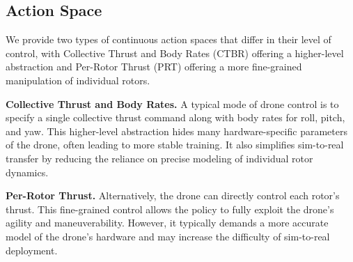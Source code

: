 

\subsection{Action Space}

We provide two types of continuous action spaces that differ in their level of control, with Collective Thrust and Body Rates (CTBR) offering a higher-level abstraction and Per-Rotor Thrust (PRT) offering a more fine-grained manipulation of individual rotors.

\textbf{Collective Thrust and Body Rates.}
A typical mode of drone control is to specify a single collective thrust command along with body rates for roll, pitch, and yaw. This higher-level abstraction hides many hardware-specific parameters of the drone, often leading to more stable training. It also simplifies sim-to-real transfer by reducing the reliance on precise modeling of individual rotor dynamics.

\textbf{Per-Rotor Thrust.}
Alternatively, the drone can directly control each rotor’s thrust. This fine-grained control allows the policy to fully exploit the drone’s agility and maneuverability. However, it typically demands a more accurate model of the drone’s hardware and may increase the difficulty of sim-to-real deployment. 



